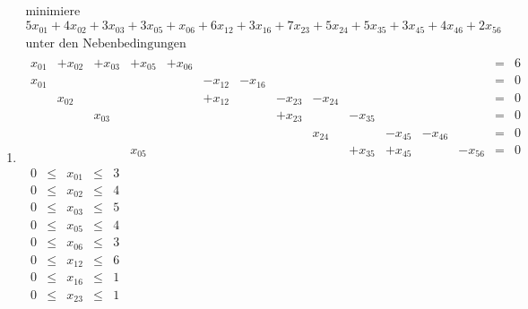 \documentclass[a4paper]{scrartcl}
\begin{document}
\begin{enumerate}[label=\bfseries\arabic*.]
\begin{enumerate}
            \item
                \begin{equation}
                    \begin{gathered}
                        \text{minimiere} \\
                        5x_{01} +4x_{02} +3x_{03} +3x_{05} +x_{06} +6x_{12} +3x_{16} +7x_{23} +5x_{24} +5x_{35} +3x_{45} +4x_{46} +2x_{56} \\
                        \text{unter den Nebenbedingungen} \\
                        \begin{array}{rrrrrrrrrrrrrcr}
                            x_{01} & +x_{02} & +x_{03} & +x_{05} & +x_{06} & & & & & & & & & = & 6 \\
                            x_{01} & & & & & -x_{12} & -x_{16} & & & & & & & = & 0 \\
                             & x_{02} & & & & +x_{12} & & -x_{23} & -x_{24} & & & & & = & 0 \\
                             & & x_{03} & & & & & +x_{23} & & -x_{35} & & & & = & 0 \\
                             & & & & & & & & x_{24} & & -x_{45} & -x_{46} & & = & 0 \\
                             & & & x_{05} & & & & & & +x_{35} & +x_{45} & & -x_{56} & = & 0
                        \end{array} \\
                        \begin{array}{rcrcr}
                            0 & \leq & x_{01} & \leq & 3 \\
                            0 & \leq & x_{02} & \leq & 4 \\
                            0 & \leq & x_{03} & \leq & 5 \\
                            0 & \leq & x_{05} & \leq & 4 \\
                            0 & \leq & x_{06} & \leq & 3 \\
                            0 & \leq & x_{12} & \leq & 6 \\
                            0 & \leq & x_{16} & \leq & 1 \\
                            0 & \leq & x_{23} & \leq & 1 \\

\end{array}
\end{gathered}
\end{equation}
\end{enumerate}
\end{enumerate}
\end{document}
